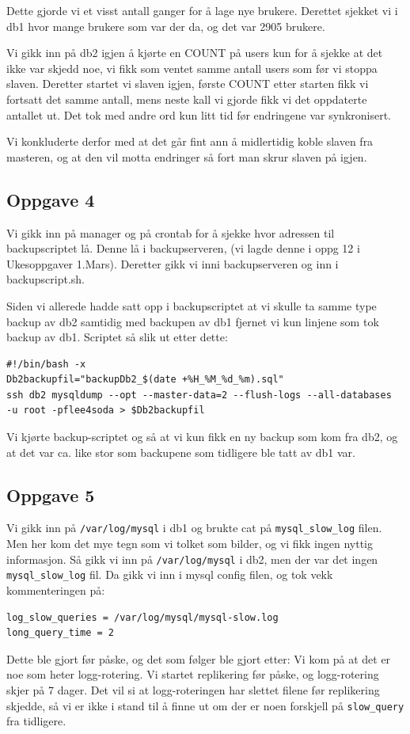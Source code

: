 \documentclass[a4paper, norsk, 12pt]{article}
\begin{document}
Dette gjorde vi et visst antall ganger for å lage nye brukere. Derettet sjekket vi i db1 hvor mange brukere som var der da, og det var 2905 brukere.

Vi gikk inn på db2 igjen å kjørte en COUNT på users kun for å sjekke at det ikke var skjedd noe, vi fikk som ventet samme antall users som før vi stoppa slaven. Deretter startet vi slaven igjen, første COUNT etter starten fikk vi fortsatt det samme antall, mens neste kall vi gjorde fikk vi det oppdaterte antallet ut. Det tok med andre ord kun litt tid før endringene var synkronisert.

Vi konkluderte derfor med at det går fint ann å midlertidig koble slaven fra masteren, og at den vil motta endringer så fort man skrur slaven på igjen.

\subsection{Oppgave 4}
Vi gikk inn på manager og på crontab for å sjekke hvor adressen til backupscriptet lå. Denne lå i backupserveren, (vi lagde denne i oppg 12 i Ukesoppgaver 1.Mars). Deretter gikk vi inni backupserveren og inn i backupscript.sh.

Siden vi allerede hadde satt opp i backupscriptet at vi skulle ta samme type backup av db2 samtidig med backupen av db1 fjernet vi kun linjene som tok backup av db1. Scriptet så slik ut etter dette:
\begin{verbatim}
#!/bin/bash -x
Db2backupfil="backupDb2_$(date +%H_%M_%d_%m).sql"
ssh db2 mysqldump --opt --master-data=2 --flush-logs --all-databases 
-u root -pflee4soda > $Db2backupfil
\end{verbatim}
Vi kjørte backup-scriptet og så at vi kun fikk en ny backup som kom fra db2, og at det var ca. like stor som backupene som tidligere ble tatt av db1 var.
\subsection{Oppgave 5}
Vi gikk inn på \verb|/var/log/mysql| i db1 og brukte cat på \verb|mysql_slow_log| filen. Men her kom det mye tegn som vi tolket som bilder, og vi fikk ingen nyttig informasjon. Så gikk vi inn på \verb|/var/log/mysql| i db2, men der var det ingen \verb|mysql_slow_log| fil. Da gikk vi inn i mysql config filen, og tok vekk kommenteringen på:
\begin{verbatim}
log_slow_queries = /var/log/mysql/mysql-slow.log
long_query_time = 2
\end{verbatim}
Dette ble gjort før påske, og det som følger ble gjort etter:
Vi kom på at det er noe som heter logg-rotering. Vi startet replikering før påske, og logg-rotering skjer på 7 dager. Det vil si at logg-roteringen har slettet filene før replikering skjedde, så vi er ikke i stand til å finne ut om der er noen forskjell på \verb|slow_query| fra tidligere.
\end{document}
